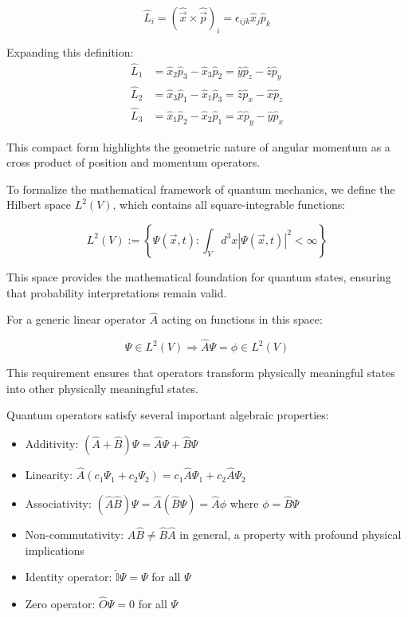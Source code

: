 \documentclass[italian]{HKNdocument}
\begin{document}
\begin{equation}
\hat{L}_{i} = (\hat{\vec{x}} \times \hat{\vec{p}})_{i} = \epsilon_{i j k} \hat{x}_{j} \hat{p}_{k} \label{eq:1.49}
\end{equation}

Expanding this definition:
\begin{align}
\hat{L}_1 &= \hat{x}_2\hat{p}_3 - \hat{x}_3\hat{p}_2 = \hat{y}\hat{p}_z - \hat{z}\hat{p}_y \\
\hat{L}_2 &= \hat{x}_3\hat{p}_1 - \hat{x}_1\hat{p}_3 = \hat{z}\hat{p}_x - \hat{x}\hat{p}_z \\
\hat{L}_3 &= \hat{x}_1\hat{p}_2 - \hat{x}_2\hat{p}_1 = \hat{x}\hat{p}_y - \hat{y}\hat{p}_x
\end{align}

This compact form highlights the geometric nature of angular momentum as a cross product of position and momentum operators.

To formalize the mathematical framework of quantum mechanics, we define the Hilbert space $L^{2}(V)$, which contains all square-integrable functions:

\begin{equation}
L^{2}(V) := \left\{\Psi(\vec{x},t) : \int_{V} d^{3}x |\Psi(\vec{x},t)|^{2} < \infty \right\} \label{eq:1.50}
\end{equation}

This space provides the mathematical foundation for quantum states, ensuring that probability interpretations remain valid.

For a generic linear operator $\hat{A}$ acting on functions in this space:

\begin{equation}
\Psi \in L^{2}(V) \Rightarrow \hat{A}\Psi = \phi \in L^{2}(V) \label{eq:1.51}
\end{equation}

This requirement ensures that operators transform physically meaningful states into other physically meaningful states.

Quantum operators satisfy several important algebraic properties:

\begin{itemize}
  \item Additivity: $(\hat{A}+\hat{B})\Psi = \hat{A}\Psi + \hat{B}\Psi$
  \item Linearity: $\hat{A}(c_{1}\Psi_{1} + c_{2}\Psi_{2}) = c_{1}\hat{A}\Psi_{1} + c_{2}\hat{A}\Psi_{2}$
  \item Associativity: $(\hat{A}\hat{B})\Psi = \hat{A}(\hat{B}\Psi) = \hat{A}\phi$ where $\phi = \hat{B}\Psi$
  \item Non-commutativity: $\hat{A}\hat{B} \neq \hat{B}\hat{A}$ in general, a property with profound physical implications
  \item Identity operator: $\hat{\mathbb{I}}\Psi = \Psi$ for all $\Psi$
  \item Zero operator: $\hat{O}\Psi = 0$ for all $\Psi$
\end{itemize}
\end{document}

